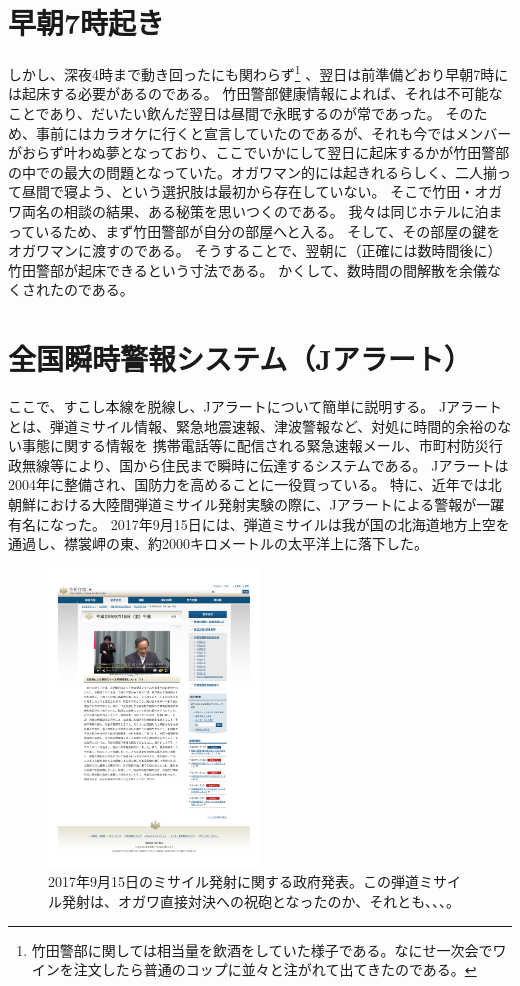 \section{早朝7時起き}
しかし、深夜4時まで動き回ったにも関わらず\footnote{竹田警部に関しては相当量を飲酒をしていた様子である。なにせ一次会でワインを注文したら普通のコップに並々と注がれて出てきたのである。}
、翌日は前準備どおり早朝7時には起床する必要があるのである。
竹田警部健康情報によれば、それは不可能なことであり、だいたい飲んだ翌日は昼間で永眠するのが常であった。
そのため、事前にはカラオケに行くと宣言していたのであるが、それも今ではメンバーがおらず叶わぬ夢となっており、ここでいかにして翌日に起床するかが竹田警部の中での最大の問題となっていた。オガワマン的には起きれるらしく、二人揃って昼間で寝よう、という選択肢は最初から存在していない。
そこで竹田・オガワ両名の相談の結果、ある秘策を思いつくのである。
我々は同じホテルに泊まっているため、まず竹田警部が自分の部屋へと入る。
そして、その部屋の鍵をオガワマンに渡すのである。
そうすることで、翌朝に（正確には数時間後に）竹田警部が起床できるという寸法である。
かくして、数時間の間解散を余儀なくされたのである。

\section{全国瞬時警報システム（Jアラート）}
ここで、すこし本線を脱線し、Jアラートについて簡単に説明する。
Jアラートとは、弾道ミサイル情報、緊急地震速報、津波警報など、対処に時間的余裕のない事態に関する情報を
携帯電話等に配信される緊急速報メール、市町村防災行政無線等により、国から住民まで瞬時に伝達するシステムである。
Jアラートは2004年に整備され、国防力を高めることに一役買っている。
特に、近年では北朝鮮における大陸間弾道ミサイル発射実験の際に、Jアラートによる警報が一躍有名になった。
2017年9月15日には、弾道ミサイルは我が国の北海道地方上空を通過し、襟裳岬の東、約2000キロメートルの太平洋上に落下した。

\begin{figure}[htbp]
  \begin{center}
    \includegraphics[width=0.5\textwidth]{./section/sasakiLIVE/figures/Jalert.pdf}
  \end{center}
  \caption{2017年9月15日のミサイル発射に関する政府発表。この弾道ミサイル発射は、オガワ直接対決への祝砲となったのか、それとも、、、。}
  \label{fig:Jalert}
\end{figure}

